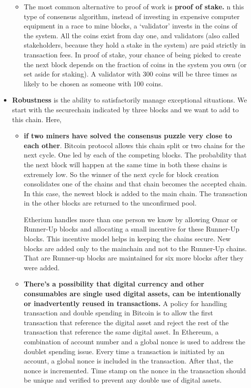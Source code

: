 \documentclass{article}
\begin{document}
\begin{itemize}
\begin{itemize}
         \item The most common alternative to proof of work is \textbf{proof of stake.} n this type of consensus algorithm, instead of investing in expensive computer equipment in a race to mine blocks, a ‘validator’ invests in the coins of the system. All the coins exist from day one, and validators (also called stakeholders, because they hold a stake in the system) are paid strictly in transaction fees. In proof of stake, your chance of being picked to create the next block depends on the fraction of coins in the system you own (or set aside for staking). A validator with 300 coins will be three times as likely to be chosen as someone with 100 coins.
     \end{itemize}
     \item \textbf{Robustness} is the ability to satisfactorily manage exceptional situations. We start with the securechain indicated by three blocks and we want to add to this chain. Here, 
     \begin{itemize}
         \item  \textbf{if two miners have solved the consensus puzzle very close to each other}. Bitcoin protocol allows this chain split or two chains for the next cycle. One led by each of the competing blocks. The probability that the next block will happen at the same time in both these chains is extremely low. So the winner of the next cycle for block creation consolidates one of the chains and that chain becomes the accepted chain. In this case, the newest block is added to the main chain. The transaction in the other blocks are returned to the unconfirmed pool. \par
     Etherium handles more than one person we know by allowing Omar or Runner-Up blocks and allocating a small incentive for these Runner-Up blocks. This incentive model helps in keeping the chains secure. New blocks are added only to the mainchain and not to the Runner-Up chains. That are Runner-up blocks are maintained for six more blocks after they were added. \\
     \item \textbf{There's a possibility that digital currency and other consumables are single used digital assets, can be intentionally or inadvertently reused in transactions. } A policy for handling transaction and double spending in Bitcoin is to allow the first transaction that reference the digital asset and reject the rest of the transaction that reference the same digital asset. In Ethereum, a combination of account number and a global nonce is used to address the doublet spending issue. Every time a transaction is initiated by an account, a global nonce is included in the transaction. After that, the nonce is incremented. Time stamp on the nonce in the transaction should be unique and verified to prevent any double use of digital assets.

\end{itemize}
\end{itemize}
\end{document}
